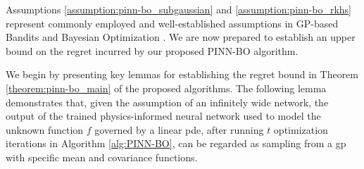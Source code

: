 Assumptions \ref{assumption:pinn-bo_subgaussian} and \ref{assumption:pinn-bo_rkhs} represent commonly employed and well-established assumptions in GP-based Bandits and Bayesian Optimization \citep{chowdhury2017kernelized,vakili2021optimal}. We are now prepared to establish an upper bound on the regret incurred by our proposed PINN-BO algorithm.  

We begin by presenting key lemmas for establishing the regret bound in Theorem \ref{theorem:pinn-bo_main} of the proposed algorithms. The following lemma demonstrates that, given the assumption of an infinitely wide network, the output of the trained physics-informed neural network used to model the unknown function $f$ governed by a linear \ac{pde}, after running $t$ optimization iterations in Algorithm \ref{alg:PINN-BO}, can be regarded as sampling from a \ac{gp} with specific mean and covariance functions.
